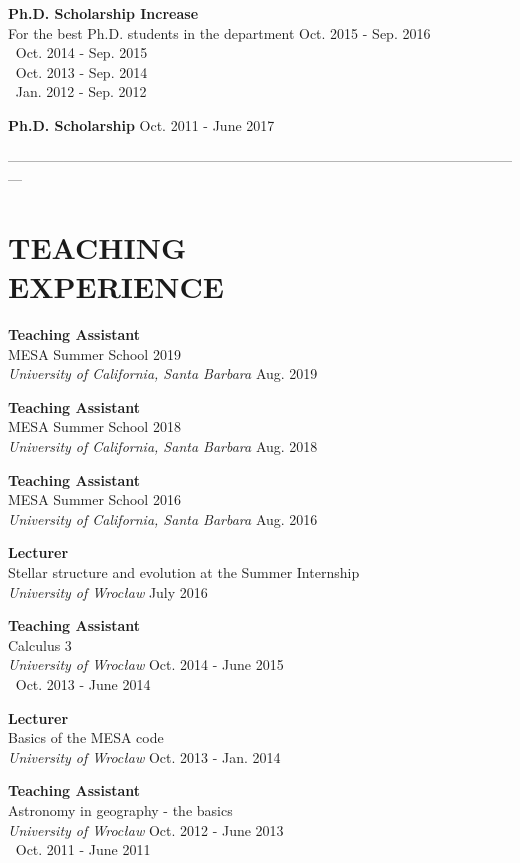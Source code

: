 \documentclass[margin, 10pt]{res} %
\begin{document}
\begin{resume}
{\bf Ph.D. Scholarship Increase} \\
For the best Ph.D. students in the department \hfill Oct. 2015 - Sep. 2016 \\
$~$ \hfill Oct. 2014 - Sep. 2015 \\
$~$ \hfill Oct. 2013 - Sep. 2014 \\
$~$ \hfill Jan. 2012 - Sep. 2012

{\bf Ph.D. Scholarship}  \hfill Oct. 2011 - June 2017

---------------------------------------------------------------------------------------------------------------

\section{TEACHING \\ EXPERIENCE}  

{\bf Teaching Assistant} \\
MESA Summer School 2019 \\
{\sl University of California, Santa Barbara} \hfill Aug. 2019

{\bf Teaching Assistant} \\
MESA Summer School 2018 \\
{\sl University of California, Santa Barbara} \hfill Aug. 2018

{\bf Teaching Assistant} \\
MESA Summer School 2016 \\
{\sl University of California, Santa Barbara} \hfill Aug. 2016

{\bf Lecturer} \\
Stellar structure and evolution at the Summer Internship \\
{\sl University of Wroc\l{}aw} \hfill July 2016

{\bf Teaching Assistant} \\
Calculus 3 \\
{\sl University of Wroc\l{}aw }\hfill Oct. 2014 - June 2015 \\
$~$ \hfill Oct. 2013 - June 2014

{\bf Lecturer} \\
Basics of the MESA code \\
{\sl University of Wroc\l{}aw} \hfill Oct. 2013 - Jan. 2014

{\bf Teaching Assistant} \\
Astronomy in geography - the basics \\
{\sl University of Wroc\l{}aw} \hfill Oct. 2012 - June 2013 \\
$~$ \hfill Oct. 2011 - June 2011


\end{resume}
\end{document}
